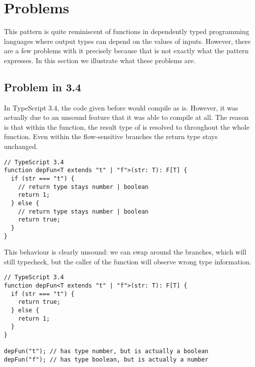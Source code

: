 \section{Problems}
\label{sec:problems}

This pattern is quite reminiscent of functions in dependently typed programming languages where output types can depend on the values of inputs. However, there are a few problems with it precisely because that is not exactly what the pattern expresses. In this section we illustrate what these problems are.

\subsection{Problem in 3.4}

In TypeScript 3.4, the  code given before would compile as is. However, it was actually due to an unsound feature that it was able to compile at all. The reason is that within the function, the result type of  is resolved to  throughout the whole function. Even within the flow-sensitive branches the return type stays unchanged.

\begin{lstlisting}
// TypeScript 3.4
function depFun<T extends "t" | "f">(str: T): F[T] {
  if (str === "t") {
    // return type stays number | boolean
    return 1;
  } else {
    // return type stays number | boolean
    return true;
  }
}
\end{lstlisting}

This behaviour is clearly unsound: we can swap around the branches, which will still typecheck, but the caller of the function will observe wrong type information.

\begin{lstlisting}
// TypeScript 3.4
function depFun<T extends "t" | "f">(str: T): F[T] {
  if (str === "t") {
    return true;
  } else {
    return 1;
  }
}

depFun("t"); // has type number, but is actually a boolean
depFun("f"); // has type boolean, but is actually a number
\end{lstlisting}


